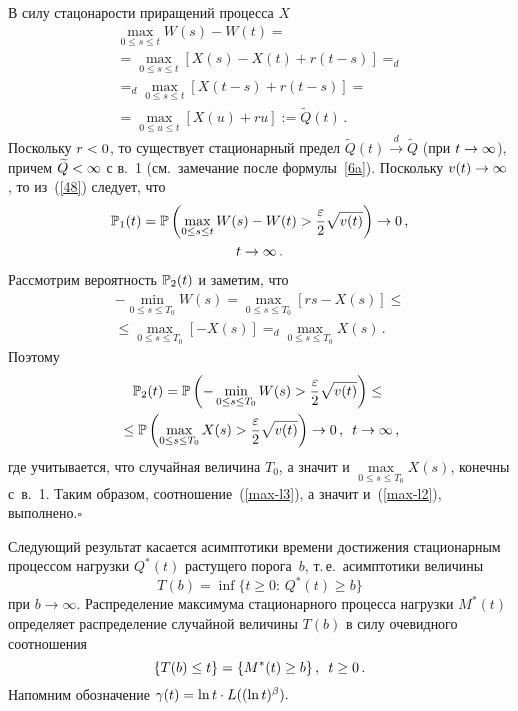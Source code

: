 \begin{multicols}{2}
\begin{multline*}
\end{multline*}
 В силу стацонарости приращений процесса $X$
\begin{multline}
\max\limits_{0 \leq s \leq t} W(s) - W(t)= {}\\
{}=
\max\limits_{0 \leq s \leq t} \left[  X(s)- X(t)+r(t-s)\right]=_d\\
{}=_d \max\limits_{0 \leq s \leq t}\left[  X(t-s)+r(t-s)\right]=\\
= \max\limits_{0 \leq u \leq t}\left[
X(u)+ru\right]:=\widetilde{Q}(t)\,.
\label{48}
\end{multline}
Поскольку  $r\hm<0$, то существует стационарный предел
$\widetilde{Q}(t) \xrightarrow{d} \widetilde {Q}$ (при $t \hm\to \infty$),
причем  $ \widetilde{Q}\hm<\infty$ с в.~1 (см.\ замечание после формулы~\eqref{6a}). 
Поскольку $v(t) \hm\to \infty$, то из~(\ref{48}) следует,
что
\begin{multline*}
\mathbb{P}_1(t)=\mathbb{P}\left( \max\limits_{0 \leq s \leq t}W(s)-W(t)>
\displaystyle\frac{\displaystyle \varepsilon\mathstrut}{\displaystyle 2\mathstrut}\sqrt{v(t)}  \right) \to 0\,,\\
 t \to \infty\,.
\end{multline*}
Рассмотрим  вероятность $\mathbb{P}_2(t)$ и заметим, что
\begin{multline*}
-\min\limits_{0 \leq s \leq T_0} W(s)=\max\limits_{0 \leq s \leq T_0 }[rs- X(s)]\leq{}\\
{}\leq \max\limits_{0 \leq s \leq T_0}[- X(s)]=_d  \max\limits_{0 \leq s \leq T_0}X(s)\,.
\end{multline*}
Поэтому
\begin{multline*}
\mathbb{P}_2(t) = \mathbb{P}\left( -\min\limits_{0 \leq s \leq T_0}W(s)>
\displaystyle\frac{\displaystyle \varepsilon\mathstrut}{\displaystyle 2\mathstrut}\sqrt{v(t)} \right)\leq{}\\
{}\leq \mathbb{P}\left( \max\limits_{0 \leq s \leq T_0}X(s)>
\displaystyle\frac{\displaystyle \varepsilon\mathstrut}{\displaystyle 2\mathstrut}\sqrt{v(t)}\right) \to 0\,,\enskip t \to \infty\,,
\end{multline*}
где учитывается, что  случайная величина  $T_0$, а значит и $\max\limits_{0\leq s \leq T_0}X(s)$, 
конечны с~в.~1. Таким образом, соотношение~(\ref{max-l3}), а значит и~(\ref{max-l2}), выполнено.\hfill$\square$

\smallskip

Следующий результат касается асимптотики времени достижения
стационарным процессом нагрузки $Q^*(t)$ растущего порога~$b$, т.\,е.\
асимптотики величины
$$
T(b)=\inf\{t \geq 0:\,Q^*(t)\geq b\}
$$
при $b\to \infty$.  Распределение максимума стационарного процесса
нагрузки $M^*(t)$ определяет распределение случайной величины $T(b)$
в силу  очевидного соотношения
\begin{equation}
\{ T(b) \leq t\}=\{M^*(t) \geq b \}\,,\enskip t\ge 0\,.
\label{time-l0}
\end{equation}
Напомним обозначение $\gamma(t)\hm=\ln t \cdot L((\ln t)^\beta).$


\end{multicols}
